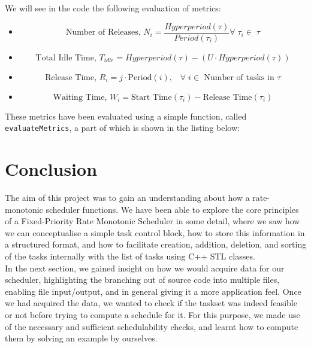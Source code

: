  We will see in the code the following evaluation of metrics:
 \begin{itemize}

  \item \begin{equation}
          \mbox{Number of Releases, } N_i = \frac{Hyperperiod(\tau)}{Period(\tau_{i})} \forall\;\tau_{i} \in \;\tau
        \end{equation}

 \item \begin{equation}
          \mbox{Total Idle Time, } T_{idle} = Hyperperiod(\tau) - (U \cdot Hyperperiod(\tau))
       \end{equation}

 \item
      \begin{equation}
            \mbox{Release Time, }R_i = j \cdot \mbox{Period}(i), \;\;\;\forall \;i \in \mbox{ Number of tasks in }\tau
       \end{equation}

  \item
      \begin{equation}
          \mbox{Waiting Time, } W_i = \mbox{Start Time}(\tau_i) - \mbox{Release Time}(\tau_i)
      \end{equation}
\end{itemize}

These metrics have been evaluated using a simple function, called \texttt{evaluateMetrics}, a part of which is shown in the listing below:


\section{Conclusion}
The aim of this project was to gain an understanding about how a rate-monotonic scheduler functions. We have been able to explore the core principles of a Fixed-Priority Rate Monotonic Scheduler in some detail, where we saw how we can conceptualise a simple task control block, how to store this information in a structured format, and how to facilitate creation, addition, deletion, and sorting of the tasks internally with the list of tasks using C++ STL classes.\\

In the next section, we gained insight on how we would acquire data for our scheduler, highlighting the branching out of source code into multiple files, enabling file input/output, and in general giving it a more application feel. Once we had acquired the data, we wanted to check if the taskset was indeed feasible or not before trying to compute a schedule for it. For this purpose, we made use of the necessary and sufficient schedulability checks, and learnt how to compute them by solving an example by ourselves.\\

